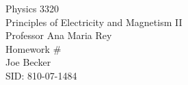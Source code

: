 \begin{titlepage}
\setlength{\topmargin}{1.5in}
\begin{center}
\Huge{Physics 3320} \\
\LARGE{Principles of Electricity and Magnetism II} \\
\Large{Professor Ana Maria Rey} \\[1cm]

\huge{Homework \#\HWnum}\\[0.5cm]

\large{Joe Becker} \\
\large{SID: 810-07-1484} \\
\large{\due} 

\end{center}

\end{titlepage}

